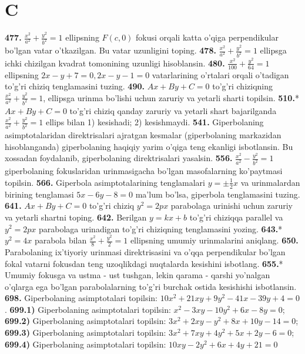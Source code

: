 \section{C}


\textbf{477.} $\frac{x^2}{a^2}+\frac{y^2}{b^2}=1$ ellipsning $F(c, 0)$ fokusi orqali katta o'qiga perpendikular bo'lgan vatar o'tkazilgan. Bu vatar uzunligini toping.
\textbf{478.} $\frac{x^2}{a^2}+\frac{y^2}{b^2}=1$ ellipsga ichki chizilgan kvadrat tomonining uzunligi hisoblansin.
\textbf{480.} $\frac{x^2}{100}+\frac{y^2}{64}=1$ ellipsning $2 x-y+7=0,2 x-y-1=0$ vatarlarining o'rtalari orqali o'tadigan to'g'ri chiziq tenglamasini tuzing.
\textbf{490.} $A x+B y+C=0$ to'g'ri chiziqning $\frac{x^2}{a^2}+\frac{y^2}{b^2}=1$, ellipsga urinma bo'lishi uchun zaruriy va yetarli sharti topilsin.
\textbf{510.}* $A x+B y+C=0$ to'g'ri chiziq qanday zaruriy va yetarli shart bajarilganda $\frac{x^2}{a^2}+\frac{y^2}{b^2}=1$ ellips bilan 1) kesishadi; 2) kesishmaydi.
\textbf{541.} Giperbolaning asimptotalaridan direktrisalari ajratgan kesmalar (giperbolaning markazidan hisoblanganda) giperbolaning haqiqiy yarim o'qiga teng ekanligi isbotlansin. Bu xossadan foydalanib, giperbolaning direktrisalari yasalsin.
\textbf{556.} $\frac{x^2}{a^2}-\frac{y^2}{b^2}=1$ giperbolaning fokuslaridan urinmasigacha bo'lgan masofalarning ko'paytmasi topilsin.
\textbf{566.} Giperbola asimptotalarining tenglamalari $y= \pm \frac{1}{2} x$ va urinmalardan birining tenglamasi $5 x-6 y-8=0$ ma'lum bo'lsa, giperbola tenglamasini tuzing.
\textbf{641.} $A x+B y+C=0$ to'g'ri chiziq $y^2=2 p x$ parabolaga urinishi uchun zaruriy va yetarli shartni toping.
\textbf{642.} Berilgan $y=k x+b$ to'g'ri chiziqqa parallel va $y^2=2 p x$ parabolaga urinadigan to'g'ri chiziqning tenglamasini yozing.
\textbf{643.}* $y^2=4 x$ parabola bilan $\frac{x^2}{8}+\frac{y^2}{2}=1$ ellipsning umumiy urinmalarini aniqlang.
\textbf{650.} Parabolaning ix'tiyoriy urinmasi direktrisasini va o'qqa perpendikular bo'lgan fokal vatarni fokusdan teng uzoqlikdagi nuqtalarda kesishini isbotlang.
\textbf{655.}* Umumiy fokusga va ustma - ust tushgan, lekin qarama - qarshi yo'nalgan o'qlarga ega bo'lgan parabolalarning to'g'ri burchak ostida kesishishi isbotlansin.
\textbf{698.} Giperbolaning asimptotalari topilsin: $10 x^2+21 x y+9 y^2-41 x-39 y+4=0$.
\textbf{699.1)} Giperbolaning asimptotalari topilsin: $x^2-3 x y-10 y^2+6 x-8 y=0$;
\textbf{699.2)} Giperbolaning asimptotalari topilsin: $3 x^2+2 x y-y^2+8 x+10 y-14=0$;
\textbf{699.3)} Giperbolaning asimptotalari topilsin: $3 x^2+7 x y+4 y^2+5 x+2 y-6=0$;
\textbf{699.4)} Giperbolaning asimptotalari topilsin: $10 x y-2 y^2+6 x+4 y+21=0$
